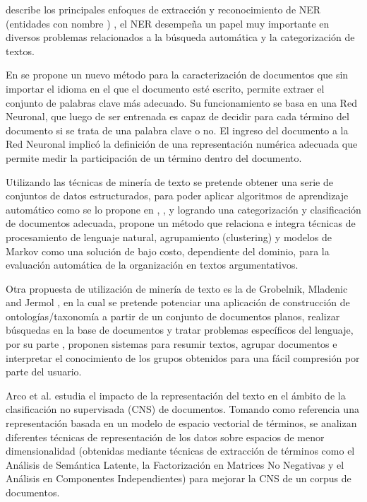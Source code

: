 \cite{troyano2003identificacion} describe los principales enfoques de extracción y reconocimiento de NER (entidades con nombre ) , 
el NER desempeña un papel muy importante en diversos problemas relacionados a la búsqueda automática y la categorización de textos.
 
En \cite{figuerola2004algunas} se propone un nuevo método para la caracterización de documentos que sin importar el idioma en el que el 
documento esté escrito, permite extraer el conjunto de palabras clave más adecuado. Su funcionamiento se basa en una Red Neuronal, que
luego de ser entrenada es capaz de decidir para cada término del documento si se trata de una palabra clave o no. El ingreso del documento a la Red Neuronal implicó la definición de una representación numérica adecuada que permite medir la participación de un término dentro del documento.

Utilizando  las técnicas de minería de texto se pretende obtener una serie de conjuntos de datos estructurados, 
para poder aplicar algoritmos de aprendizaje automático como se lo propone en \cite{llorens1998caracteristicas}, 
\cite{santana2014aplicacion}, \cite{barrera2016mineria} y \cite{rodriguez2018metodos}  logrando una categorización
y clasificación de documentos adecuada, \cite{ropero2014metodo}  propone un método que relaciona e integra técnicas de procesamiento de lenguaje natural,
agrupamiento (clustering) y modelos de Markov como una solución de bajo costo, dependiente del dominio, para la evaluación automática 
de la organización en textos argumentativos. 

Otra propuesta de utilización de minería de texto es la de Grobelnik, Mladenic  and Jermol  \cite{grobelnik2002exploiting}, en la cual se pretende potenciar una aplicación de construcción de ontologías/taxonomía a
partir de un conjunto de documentos planos, realizar búsquedas en la base de documentos y tratar problemas específicos del lenguaje,
por su parte \cite{cobo2006tecnicas},\cite{neto2000document} proponen sistemas  para resumir textos, agrupar documentos e interpretar el conocimiento de los grupos obtenidos para una  fácil compresión  por parte  del usuario.

Arco et al.\cite{arco2006agrupamiento} estudia el impacto de la representación del texto en el ámbito de la clasificación no supervisada (CNS) de documentos.
Tomando como referencia una representación basada en un modelo de espacio vectorial de términos, se analizan diferentes
técnicas de representación de los datos sobre espacios de menor dimensionalidad (obtenidas mediante técnicas de extracción de
términos como el Análisis de Semántica Latente, la Factorización en Matrices No Negativas y el Análisis en Componentes Independientes)
para mejorar la CNS de un corpus de documentos.

